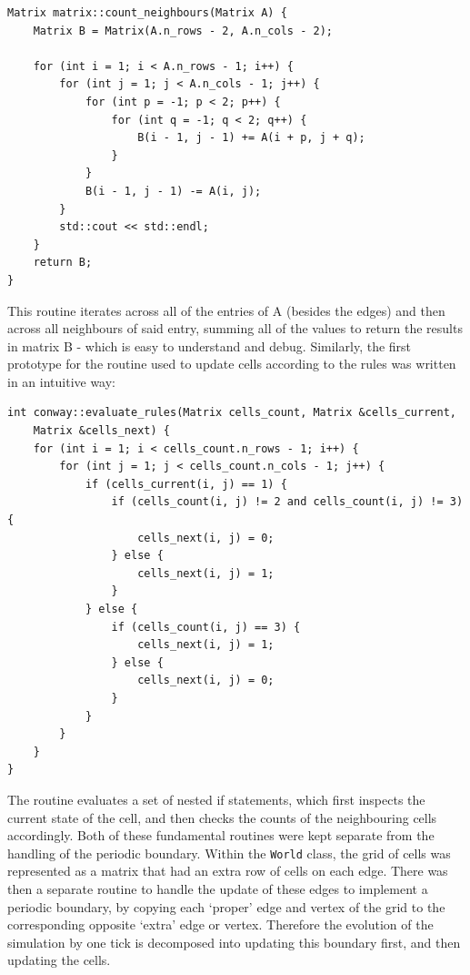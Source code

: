 \documentclass[12pt]{article}
\begin{document}
\begin{lstlisting}
Matrix matrix::count_neighbours(Matrix A) {
    Matrix B = Matrix(A.n_rows - 2, A.n_cols - 2);

    for (int i = 1; i < A.n_rows - 1; i++) {
        for (int j = 1; j < A.n_cols - 1; j++) {
            for (int p = -1; p < 2; p++) {
                for (int q = -1; q < 2; q++) {
                    B(i - 1, j - 1) += A(i + p, j + q);
                }
            }
            B(i - 1, j - 1) -= A(i, j);
        }
        std::cout << std::endl;
    }
    return B;
}
\end{lstlisting}

This routine iterates across all of the entries of A (besides the edges) and then across all neighbours of said entry,
summing all of the values to return the results in matrix B - which is easy to understand and debug.
Similarly, the first prototype for the routine used to update cells according to the rules was written in an intuitive way:

\begin{lstlisting}
int conway::evaluate_rules(Matrix cells_count, Matrix &cells_current,
    Matrix &cells_next) {
    for (int i = 1; i < cells_count.n_rows - 1; i++) {
        for (int j = 1; j < cells_count.n_cols - 1; j++) {
            if (cells_current(i, j) == 1) {
                if (cells_count(i, j) != 2 and cells_count(i, j) != 3) {
                    cells_next(i, j) = 0;
                } else {
                    cells_next(i, j) = 1;
                }
            } else {
                if (cells_count(i, j) == 3) {
                    cells_next(i, j) = 1;
                } else {
                    cells_next(i, j) = 0;
                }
            }
        }
    }
}
\end{lstlisting}

The routine evaluates a set of nested if statements,
which first inspects the current state of the cell, and then checks the counts of the neighbouring cells accordingly.
Both of these fundamental routines were kept separate from the handling of the periodic boundary.
Within the \texttt{World} class, the grid of cells was represented as a matrix that had an extra row of cells on each edge.
There was then a separate routine to handle the update of these edges to implement a periodic boundary,
by copying each `proper' edge and vertex of the grid to the corresponding opposite `extra' edge or vertex.
Therefore the evolution of the simulation by one tick is decomposed into updating this boundary first, and then updating the cells.
\end{document}
